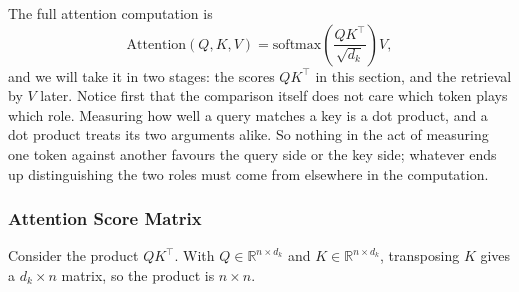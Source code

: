 \documentclass[11pt]{article}
\begin{document}
The full attention computation is
\[
\text{Attention}(Q,K,V) = \text{softmax}\!\left(\frac{QK^\top}{\sqrt{d_k}}\right) V,
\]
and we will take it in two stages: the scores $QK^\top$ in this section, and the retrieval by $V$ later. Notice first that the comparison itself does not care which token plays which role. Measuring how well a query matches a key is a dot product, and a dot product treats its two arguments alike. So nothing in the act of measuring one token against another favours the query side or the key side; whatever ends up distinguishing the two roles must come from elsewhere in the computation.

\subsubsection*{Attention Score Matrix}

Consider the product $QK^\top$. With $Q \in \mathbb{R}^{n \times d_k}$ and $K \in \mathbb{R}^{n \times d_k}$, transposing $K$ gives a $d_k \times n$ matrix, so the product is $n \times n$.
\end{document}
